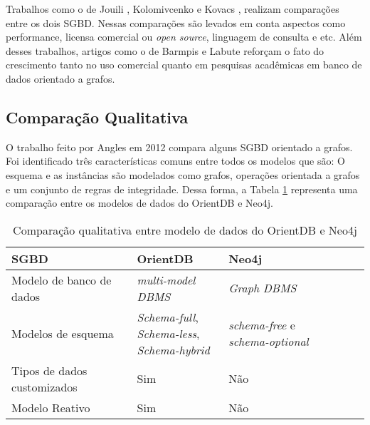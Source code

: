 	Trabalhos como o de Jouili \cite{jouili2013empirical}, Kolomivcenko \cite{kolomivcenko2013experimental} e Kovacs \cite{kovacs2016cassandra}, realizam comparações entre os dois SGBD. Nessas comparações são levados em conta aspectos como performance, licensa comercial ou \textit{open source}, linguagem de consulta e etc. Além desses trabalhos, artigos como o de Barmpis \cite{barmpis2014evaluation} e Labute \cite{labute2014review} reforçam o fato do crescimento tanto no uso comercial quanto em pesquisas acadêmicas em banco de dados orientado a grafos.
	
\subsection{Comparação Qualitativa}

	O trabalho feito por Angles \cite{angles2012comparison} em 2012 compara alguns SGBD orientado a grafos. Foi identificado três características comuns entre todos os modelos que são: O esquema e as instâncias são modelados como grafos, operações orientada a grafos e um conjunto de regras de integridade. Dessa forma, a Tabela \ref{table:1} representa uma comparação entre os modelos de dados do OrientDB e Neo4j.
	
\begin{table}[h!]
\centering
\caption{Comparação qualitativa entre modelo de dados do OrientDB e Neo4j}
\begin{tabular}{|l|l|l|l|l|}
\hline
SGBD                        & OrientDB                                                                        & Neo4j \\ \hline
Modelo de banco de dados    & \textit{multi-model DBMS}                                                       & \textit{Graph DBMS}  \\ \hline
Modelos de esquema          & \makecell{\textit{Schema-full},\\ \textit{Schema-less},\\ \textit{Schema-hybrid}} & \textit{schema-free} e \textit{schema-optional} \\ \hline
Tipos de dados customizados & Sim                                                                             & Não \\ \hline
Modelo Reativo              & Sim                                                                             & Não \\ \hline
\end{tabular}
\label{table:1}
\end{table}


